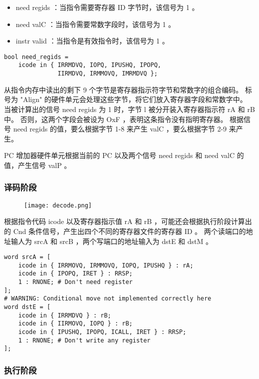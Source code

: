 \begin{itemize}
    \item need regids ：当指令需要寄存器 ID 字节时，该信号为 1 。
    \item need valC ：当指令需要常数字段时，该信号为 1 。
    \item instr valid ：当指令是有效指令时，该信号为 1 。
\end{itemize}

\begin{lstlisting}[style=CStyle]
bool need_regids =
    icode in { IRRMDVQ, IOPQ, IPUSHQ, IPOPQ,
               IIRMDVQ, IRMMOVQ, IMRMDVQ };
\end{lstlisting}

从指令内存中读出的剩下 9 个字节是寄存器指示符字节和常数字的组合编码。
标号为 "Align" 的硬件单元会处理这些字节，将它们放入寄存器字段和常数字中。
当被计算出的信号 need regids 为 1 时，字节 l 被分开装入寄存器指示符 rA 和 rB 中。
否则，这两个字段会被设为 OxF ，表明这条指令没有指明寄存器。
根据信号 need regids 的值，要么根据字节 1-8 来产生 valC ，要么根据字节 2-9 来产生。

PC 增加器硬件单元根据当前的 PC 以及两个信号 need regids 和 need valC 的值，产生信号 valP 。

\subsubsection{译码阶段}

\begin{figure}[H]
    \centering
    \texttt{[image: decode.png]}
\end{figure}

根据指令代码 icode 以及寄存器指示值 rA 和 rB ，可能还会根据执行阶段计算出的 Cnd 条件信号，产生出四个不同的寄存器文件的寄存器 ID 。
两个读端口的地址输人为 srcA 和 srcB ，两个写端口的地址输入为 dstE 和 dstM 。

\begin{lstlisting}[style=CStyle]
word srcA = [
    icode in { IRRMOVQ, IRMMOVQ, IOPQ, IPUSHQ } : rA;
    icode in { IPOPQ, IRET } : RRSP;
    1 : RNONE; # Don't need register
];
# WARNING: Conditional move not implemented correctly here
word dstE = [
    icode in { IRRMDVQ } : rB;
    icode in { IIRMOVQ, IOPQ } : rB;
    icode in { IPUSHQ, IPOPQ, ICALL, IRET } : RRSP;
    1 : RNONE; # Don't write any register
];
\end{lstlisting}

\subsubsection{执行阶段}

